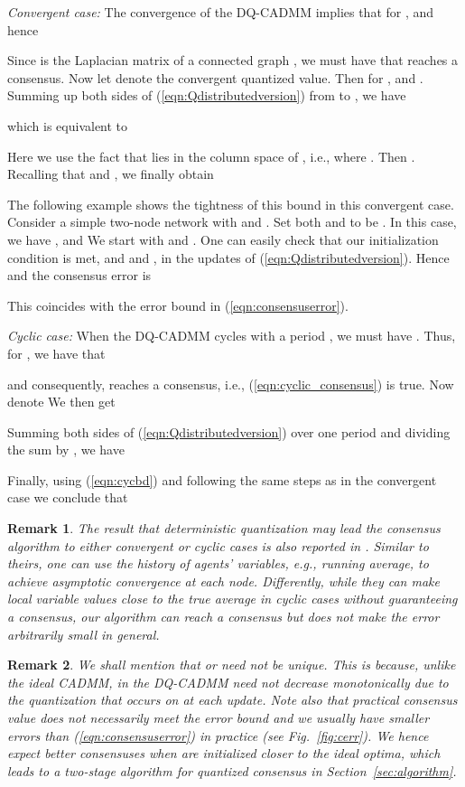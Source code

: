 \documentclass[journal]{IEEEtran}
\newtheorem{remark}{Remark}
\begin{document}
\begin{IEEEproof}
\emph{Convergent case:} The convergence of the DQ-CADMM implies that  for , and hence 

Since  is the Laplacian matrix of a connected graph , we must have that  reaches a consensus. Now let  denote the convergent quantized value. Then  for , and . Summing up both sides of (\ref{eqn:Qdistributedversion}) from  to , we have 

which is equivalent to 

Here we use the fact that  lies in the column space of , i.e.,   where . Then .
Recalling that  and , we finally obtain


The following example shows the tightness of this bound in this convergent case. Consider a simple two-node network with  and . Set both  and  to be . In this case, we have ,  and  We start with  and . One can easily check that our initialization condition is met, and  and , in the updates of (\ref{eqn:Qdistributedversion}). Hence  and the consensus error is 

This coincides with the error bound in (\ref{eqn:consensuserror}).

\emph{Cyclic case:} When the DQ-CADMM cycles with a period , we must have . Thus, for , we have that 

and consequently,  reaches a consensus, i.e., (\ref{eqn:cyclic_consensus}) is true. Now denote  We then get

Summing both sides of (\ref{eqn:Qdistributedversion}) over one period and dividing the sum by , we have 

Finally, using (\ref{eqn:cycbd}) and following the same steps as in the convergent case we conclude that 

\end{IEEEproof}
\begin{remark}
The result that deterministic quantization may lead the consensus algorithm to either convergent or cyclic cases is also reported in \cite{Chamie2014}. Similar to theirs, one can use the history of agents' variables, e.g., running average, to achieve asymptotic convergence at each node. Differently, while they can make local variable values close to the true average in cyclic cases without guaranteeing  a consensus, our algorithm can reach a consensus but does not make the error arbitrarily small in general. 
\end{remark}
\begin{remark}
\label{rmk:notglobal}
We shall mention that  or  need not be unique. This is because, unlike the ideal CADMM,  in the DQ-CADMM need not decrease monotonically due to the quantization {\em that occurs on  at each update}. Note also that practical consensus value does not necessarily meet the error bound and we usually have smaller errors than (\ref{eqn:consensuserror}) in practice (see Fig.~\ref{fig:cerr}). We hence expect better consensuses when  are initialized closer to the ideal optima, which leads to a two-stage algorithm for quantized consensus in Section~\ref{sec:algorithm}.
\end{remark}
\end{document}
